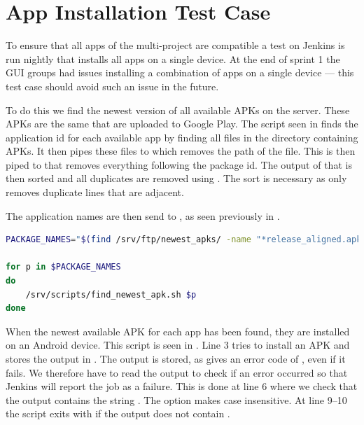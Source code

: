\section{App Installation Test Case}\label{sec:s3_appinstallationtest}
To ensure that all apps of the multi-project are compatible a test on Jenkins is run nightly that installs all apps on a single device. At the end of sprint 1 the GUI groups had issues installing a combination of apps on a single device --- this test case should avoid such an issue in the future.

To do this we find the newest version of all available APKs on the server. These APKs are the same that are uploaded to Google Play. The script seen in  finds the application id for each available app by finding all files in the directory containing APKs. It then pipes these files to  which removes the path of the file. This is then piped to  that removes everything following the package id. The output of that is then sorted and all duplicates are removed using . The sort is necessary as  only removes duplicate lines that are adjacent. 

The application names are then send to , as seen previously in .

\begin{lstlisting}[language=bash,showstringspaces=false,caption=Script that finds the newest available APK for all apps,label=lst:find_all_newest_apks]
PACKAGE_NAMES="$(find /srv/ftp/newest_apks/ -name "*release_aligned.apk" | sed 's:.*/::' | sed 's/_v.*//' | sort | uniq)"

for p in $PACKAGE_NAMES
do
    /srv/scripts/find_newest_apk.sh $p
done
\end{lstlisting}

When the newest available APK for each app has been found, they are installed on an Android device. This script is seen in . Line 3 tries to install an APK and stores the output in . The output is stored, as  gives an error code of , even if it fails. We therefore have to read the output to check if an error occurred so that Jenkins will report the job as a failure. This is done at line 6 where we check that the output contains the string . The  option makes  case insensitive. At line 9--10 the script exits with  if the output does not contain .

